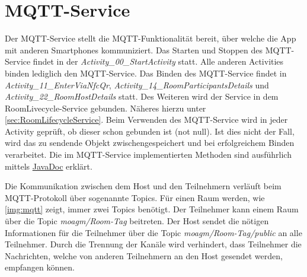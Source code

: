 \section{MQTT-Service}
\label{sec:MQTT Service}
Der MQTT-Service stellt die MQTT-Funktionalität bereit, über welche die App mit anderen Smartphones kommuniziert.
Das Starten und Stoppen des MQTT-Service findet in der \textit{Activity\_00\_StartActivity} statt. 
Alle anderen Activities binden lediglich den MQTT-Service. Das Binden des MQTT-Service findet in  \textit{Activity\_11\_EnterViaNfcQr}, \textit{Activity\_14\_RoomParticipantsDetails} und \textit{Activity\_22\_RoomHostDetails} statt. 
Des Weiteren wird der Service in dem RoomLivecycle-Service gebunden. 
Näheres hierzu unter \cref{sec:RoomLifecycleService}.  
Beim Verwenden des MQTT-Service wird in jeder Activity geprüft, ob dieser schon gebunden ist (not null). 
Ist dies nicht der Fall, wird das zu sendende Objekt zwischengespeichert und bei erfolgreichem Binden verarbeitet. 
Die im MQTT-Service implementierten Methoden sind ausführlich mittels \href{https://scm.inftech.hs-mannheim.de/gogs/moa/20moagm/src/dev/Doku/javadoc}{JavaDoc} erklärt. 

Die Kommunikation zwischen dem Host und den Teilnehmern verläuft beim MQTT-Protokoll über sogenannte Topics. 
Für einen Raum werden, wie \cref{img:mqtt} zeigt, immer zwei Topics benötigt. 
Der Teilnehmer kann einem Raum über die Topic \textit{moagm/Room-Tag} beitreten. 
Der Host sendet die nötigen Informationen für die Teilnehmer über die Topic \textit{moagm/Room-Tag/public} an alle Teilnehmer. 
Durch die Trennung der Kanäle wird verhindert, dass Teilnehmer die Nachrichten, welche von anderen Teilnehmern an den Host gesendet werden, empfangen können.

